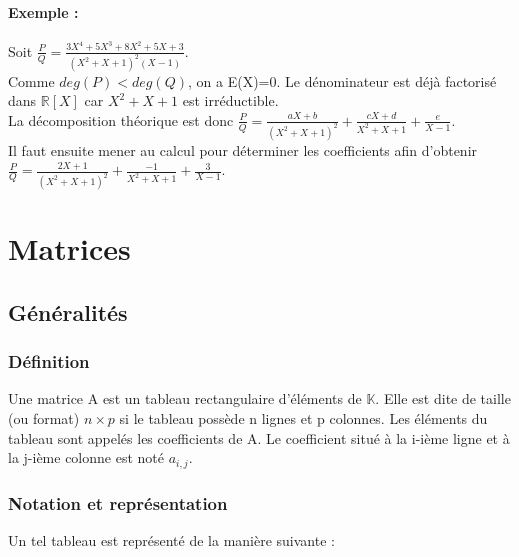 \documentclass[a4paper,10pt]{book} %
\newcommand{\R}{\mathbb{R}}
\newcommand{\K}{\mathbb{K}}
\begin{document}
\subsubsection{Exemple :}
Soit $\frac{P}{Q}=\frac{3X^{4}+5X^{3}+8X^{2}+5X+3}{(X^{2}+X+1)^{2}(X-1)}$.\\

Comme $deg(P)<deg(Q)$, on a E(X)=0. Le dénominateur est déjà factorisé dans $\R[X]$ car $X^{2}+X+1$ est irréductible.\\

La décomposition théorique est donc $\frac{P}{Q}=\frac{aX+b}{(X^{2}+X+1)^{2}}+\frac{cX+d}{X^{2}+X+1}+\frac{e}{X-1}$.\\

Il faut ensuite mener au calcul pour déterminer les coefficients afin d'obtenir\\
$\frac{P}{Q}=\frac{2X+1}{(X^{2}+X+1)^{2}}+\frac{-1}{X^{2}+X+1}+\frac{3}{X-1}$.







\chapter{Matrices}
\section{Généralités}
\subsection{Définition}
Une matrice A est un tableau rectangulaire d'éléments de $\K$. Elle est dite de taille (ou format) $n\times p$ si le tableau possède n lignes et p colonnes. Les éléments du tableau sont appelés les coefficients de A. Le coefficient situé à la i-ième ligne et à la j-ième colonne est noté $a_{i,j}$.

\subsection{Notation et représentation}
Un tel tableau est représenté de la manière suivante :\\
\end{document}
